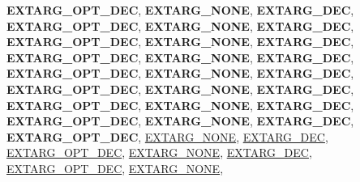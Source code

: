 \begin{DoxyCompactItemize}
{\bfseries E\+X\+T\+A\+R\+G\+\_\+\+O\+P\+T\+\_\+\+D\+EC}, 
{\bfseries E\+X\+T\+A\+R\+G\+\_\+\+N\+O\+NE}, 
\newline
{\bfseries E\+X\+T\+A\+R\+G\+\_\+\+D\+EC}, 
{\bfseries E\+X\+T\+A\+R\+G\+\_\+\+O\+P\+T\+\_\+\+D\+EC}, 
{\bfseries E\+X\+T\+A\+R\+G\+\_\+\+N\+O\+NE}, 
{\bfseries E\+X\+T\+A\+R\+G\+\_\+\+D\+EC}, 
\newline
{\bfseries E\+X\+T\+A\+R\+G\+\_\+\+O\+P\+T\+\_\+\+D\+EC}, 
{\bfseries E\+X\+T\+A\+R\+G\+\_\+\+N\+O\+NE}, 
{\bfseries E\+X\+T\+A\+R\+G\+\_\+\+D\+EC}, 
{\bfseries E\+X\+T\+A\+R\+G\+\_\+\+O\+P\+T\+\_\+\+D\+EC}, 
\newline
{\bfseries E\+X\+T\+A\+R\+G\+\_\+\+N\+O\+NE}, 
{\bfseries E\+X\+T\+A\+R\+G\+\_\+\+D\+EC}, 
{\bfseries E\+X\+T\+A\+R\+G\+\_\+\+O\+P\+T\+\_\+\+D\+EC}, 
{\bfseries E\+X\+T\+A\+R\+G\+\_\+\+N\+O\+NE}, 
\newline
{\bfseries E\+X\+T\+A\+R\+G\+\_\+\+D\+EC}, 
{\bfseries E\+X\+T\+A\+R\+G\+\_\+\+O\+P\+T\+\_\+\+D\+EC}, 
{\bfseries E\+X\+T\+A\+R\+G\+\_\+\+N\+O\+NE}, 
{\bfseries E\+X\+T\+A\+R\+G\+\_\+\+D\+EC}, 
\newline
{\bfseries E\+X\+T\+A\+R\+G\+\_\+\+O\+P\+T\+\_\+\+D\+EC}, 
{\bfseries E\+X\+T\+A\+R\+G\+\_\+\+N\+O\+NE}, 
{\bfseries E\+X\+T\+A\+R\+G\+\_\+\+D\+EC}, 
{\bfseries E\+X\+T\+A\+R\+G\+\_\+\+O\+P\+T\+\_\+\+D\+EC}, 
\newline
{\bfseries E\+X\+T\+A\+R\+G\+\_\+\+N\+O\+NE}, 
{\bfseries E\+X\+T\+A\+R\+G\+\_\+\+D\+EC}, 
{\bfseries E\+X\+T\+A\+R\+G\+\_\+\+O\+P\+T\+\_\+\+D\+EC}, 
\hyperlink{group__extensions_ggacc9f55936dc165257a2e1f7d47bce89eaabcf56c456c1ff6e81dc82586a16f14c}{E\+X\+T\+A\+R\+G\+\_\+\+N\+O\+NE}, 
\newline
\hyperlink{group__extensions_ggacc9f55936dc165257a2e1f7d47bce89ea1c86adf924c8786a12bee9687094673e}{E\+X\+T\+A\+R\+G\+\_\+\+D\+EC}, 
\hyperlink{group__extensions_ggacc9f55936dc165257a2e1f7d47bce89ea5265abe3e1c3f64412f2affe7bffd880}{E\+X\+T\+A\+R\+G\+\_\+\+O\+P\+T\+\_\+\+D\+EC}, 
\hyperlink{group__extensions_ggacc9f55936dc165257a2e1f7d47bce89eaabcf56c456c1ff6e81dc82586a16f14c}{E\+X\+T\+A\+R\+G\+\_\+\+N\+O\+NE}, 
\hyperlink{group__extensions_ggacc9f55936dc165257a2e1f7d47bce89ea1c86adf924c8786a12bee9687094673e}{E\+X\+T\+A\+R\+G\+\_\+\+D\+EC}, 
\newline
\hyperlink{group__extensions_ggacc9f55936dc165257a2e1f7d47bce89ea5265abe3e1c3f64412f2affe7bffd880}{E\+X\+T\+A\+R\+G\+\_\+\+O\+P\+T\+\_\+\+D\+EC}, 
\hyperlink{group__extensions_ggacc9f55936dc165257a2e1f7d47bce89eaabcf56c456c1ff6e81dc82586a16f14c}{E\+X\+T\+A\+R\+G\+\_\+\+N\+O\+NE}, 

\end{DoxyCompactItemize}
